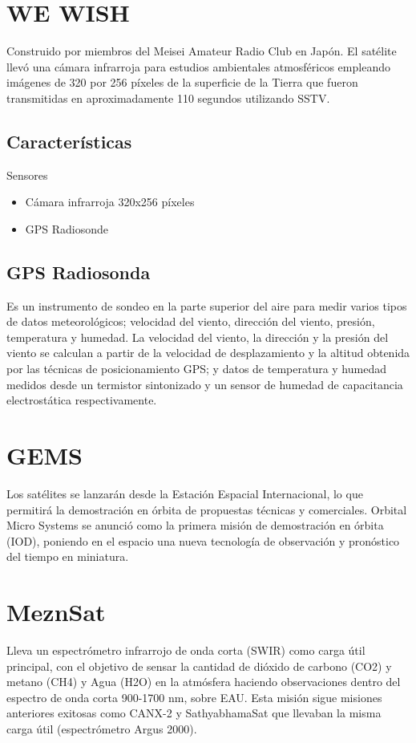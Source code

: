 \documentclass[12pt]{extarticle}
\begin{document}
\section{WE WISH}
Construido por miembros del Meisei Amateur Radio Club en Japón. El satélite llevó una cámara infrarroja para estudios ambientales atmosféricos empleando imágenes de 320 por 256 píxeles de la superficie de la Tierra que fueron transmitidas en aproximadamente 110 segundos utilizando SSTV. 

\subsection{Características}
Sensores
\begin{itemize}
    \item Cámara infrarroja 320x256 píxeles
    \item GPS Radiosonde
\end{itemize}
\subsection{GPS Radiosonda}
Es un instrumento de sondeo en la parte superior del aire para medir varios tipos de datos meteorológicos; velocidad del viento, dirección del viento, presión, temperatura y humedad. La velocidad del viento, la dirección y la presión del viento se calculan a partir de la velocidad de desplazamiento y la altitud obtenida por las técnicas de posicionamiento GPS; y datos de temperatura y humedad medidos desde un termistor sintonizado y un sensor de humedad de capacitancia electrostática respectivamente.
\section{GEMS}
 Los satélites se lanzarán desde la Estación Espacial Internacional, lo que permitirá la demostración en órbita de propuestas técnicas y comerciales. Orbital Micro Systems se anunció como la primera misión de demostración en órbita (IOD), poniendo en el espacio una nueva tecnología de observación y pronóstico del tiempo en miniatura.
 
 \section{MeznSat}
 Lleva un espectrómetro infrarrojo de onda corta (SWIR) como carga útil principal, con el objetivo de sensar la cantidad de dióxido de carbono (CO2) y metano (CH4) y Agua (H2O) en la atmósfera haciendo observaciones dentro del espectro de onda corta 900-1700 nm, sobre EAU. Esta misión sigue misiones anteriores exitosas como CANX-2 y SathyabhamaSat que llevaban la misma carga útil (espectrómetro Argus 2000).
 
\end{document}
